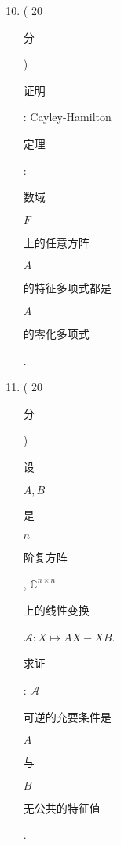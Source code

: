 \documentclass[10pt]{article}
\begin{document}
\begin{enumerate}
  \setcounter{enumi}{9}
  \item ( 20 \begin{CJK}{UTF8}{mj}分\end{CJK}) \begin{CJK}{UTF8}{mj}证明\end{CJK}: Cayley-Hamilton \begin{CJK}{UTF8}{mj}定理\end{CJK}: \begin{CJK}{UTF8}{mj}数域\end{CJK} $F$ \begin{CJK}{UTF8}{mj}上的任意方阵\end{CJK} $A$ \begin{CJK}{UTF8}{mj}的特征多项式都是\end{CJK} $A$ \begin{CJK}{UTF8}{mj}的零化多项式\end{CJK}.

  \item ( 20 \begin{CJK}{UTF8}{mj}分\end{CJK}) \begin{CJK}{UTF8}{mj}设\end{CJK} $A, B$ \begin{CJK}{UTF8}{mj}是\end{CJK} $n$ \begin{CJK}{UTF8}{mj}阶复方阵\end{CJK}, $\mathbb{C}^{n \times n}$ \begin{CJK}{UTF8}{mj}上的线性变换\end{CJK} $\mathscr{A}: X \mapsto A X-X B$. \begin{CJK}{UTF8}{mj}求证\end{CJK}: $\mathscr{A}$ \begin{CJK}{UTF8}{mj}可逆的充要条件是\end{CJK} $A$ \begin{CJK}{UTF8}{mj}与\end{CJK} $B$ \begin{CJK}{UTF8}{mj}无公共的特征值\end{CJK}.


\end{enumerate}
\end{document}
